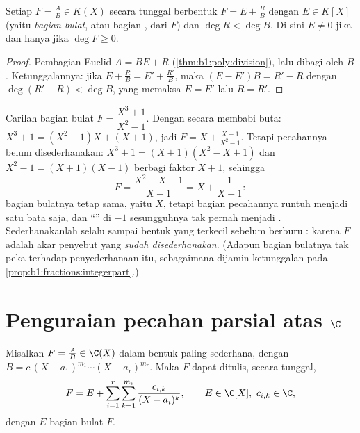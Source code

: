 \begin{proposition}\label{prop:b1:fractions:integerpart}
Setiap $F = \frac AB \in K(X)$ secara tunggal berbentuk $F = E + \frac RB$ dengan $E
\in K[X]$ (yaitu \emph{bagian bulat}, atau bagian , dari $F$) dan
$\deg R < \deg B$. Di sini $E \neq 0$ jika dan hanya jika $\deg F \geq 0$.
\end{proposition}

\begin{proof}
Pembagian Euclid $A = BE + R$ (\cref{thm:b1:poly:division}), lalu dibagi
oleh $B$. Ketunggalannya: jika $E + \frac RB = E' + \frac{R'}{B}$, maka $(E -
E')B = R' - R$ dengan $\deg(R' - R) < \deg B$, yang memaksa $E = E'$ lalu $R
= R'$.
\end{proof}

\begin{example}\label{ex:b1:fractions:integerpart}
Carilah bagian bulat $F = \dfrac{X^3 + 1}{X^2 - 1}$. Dengan 
secara membabi buta: $X^3 + 1 = (X^2 - 1)X + (X + 1)$, jadi $F = X +
\frac{X + 1}{X^2 - 1}$. Tetapi pecahannya belum disederhanakan: $X^3 + 1
= (X + 1)(X^2 - X + 1)$ dan $X^2 - 1 = (X+1)(X-1)$ berbagi faktor
$X + 1$, sehingga
\[
F = \frac{X^2 - X + 1}{X - 1} = X + \frac{1}{X - 1} :
\]
bagian bulatnya tetap sama, yaitu $X$, tetapi bagian pecahannya runtuh menjadi
satu bata saja, dan ``'' di $-1$ sesungguhnya tak pernah menjadi .
Sederhanakanlah selalu sampai bentuk yang terkecil sebelum berburu : karena 
$F$ adalah akar penyebut yang \emph{sudah disederhanakan}. (Adapun bagian
bulatnya tak peka terhadap penyederhanaan itu, sebagaimana dijamin ketunggalan pada
\cref{prop:b1:fractions:integerpart}.)
\end{example}

\section{Penguraian pecahan parsial atas $\C$}

\begin{theorem}\label{thm:b1:fractions:complex}
Misalkan $F = \frac AB \in \C(X)$ dalam bentuk paling sederhana, dengan $B = c\,(X -
a_1)^{m_1} \cdots (X - a_r)^{m_r}$. Maka $F$ dapat ditulis, secara tunggal,
\[
F = E + \sum_{i=1}^{r} \sum_{k=1}^{m_i}
\frac{c_{i,k}}{(X - a_i)^k},
\qquad E \in \C[X],\ c_{i,k} \in \C ,
\]
dengan $E$ bagian bulat $F$.
\end{theorem}

